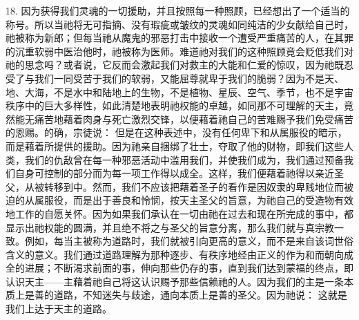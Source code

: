 18. 因为获得我们灵魂的一切援助，并且按照每一种照顾，已经想出了一个适当的称号。所以当祂将无可指摘、没有瑕疵或皱纹的灵魂如同纯洁的少女献给自己时，祂被称为新郎；但每当祂从魔鬼的邪恶打击中接收一个遭受严重痛苦的人，在其罪的沉重软弱中医治他时，祂被称为医师。难道祂对我们的这种照顾竟会贬低我们对祂的思念吗？或者说，它反而会激起我们对救主的大能和仁爱的惊叹，因为祂既忍受了与我们一同受苦于我们的软弱，又能屈尊就卑于我们的脆弱？因为不是天、地、大海，不是水中和陆地上的生物，不是植物、星辰、空气、季节，也不是宇宙秩序中的巨大多样性，如此清楚地表明祂权能的卓越，如同那不可理解的天主，竟然能无痛苦地藉着肉身与死亡激烈交锋，以便藉着祂自己的苦难赐予我们免受痛苦的恩赐。的确，宗徒说： 但是在这种表述中，没有任何卑下和从属服役的暗示，而是藉着所提供的援助。因为祂亲自捆绑了壮士，夺取了他的财物，即我们这些人类，我们的仇敌曾在每一种邪恶活动中滥用我们，并使我们成为，我们通过预备我们自身可控制的部分而为每一项工作得以成全。这样，我们便藉着祂得以亲近圣父，从被转移到中。然而，我们不应该把藉着圣子的看作是因奴隶的卑贱地位而被迫的从属服役，而是出于善良和怜悯，按天主圣父的旨意，为祂自己的受造物有效地工作的自愿关怀。因为如果我们承认在一切由祂在过去和现在所完成的事中，都显示出祂权能的圆满，并且绝不将之与圣父的旨意分离，那么我们就与真宗教一致。例如，每当主被称为道路时，我们就被引向更高的意义，而不是来自该词世俗含义的意义。我们通过道路理解为那种逐步、有秩序地经由正义的作为和而朝向成全的进展；不断渴求前面的事，伸向那些仍存的事，直到我们达到蒙福的终点，即认识天主——主藉着祂自己将这认识赐予那些信赖祂的人。因为我们的主是一条本质上是善的道路，不知迷失与歧途，通向本质上是善的圣父。因为祂说： 这就是我们上达于天主的道路。\par

